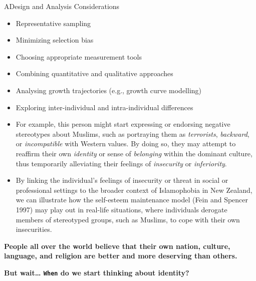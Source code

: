 \documentclass[
  ignorenonframetext,
  aspectratio=169,
]{beamer}
\providecommand{\tightlist}{%
  \setlength{\itemsep}{0pt}\setlength{\parskip}{0pt}}\usepackage{longtable,booktabs,array}
\begin{document}
\begin{frame}{ADesign and Analysis Considerations}
\label{adesign-and-analysis-considerations}
\begin{itemize}[<+->]
\tightlist
\item
  Representative sampling
\item
  Minimizing selection bias
\item
  Choosing appropriate measurement tools
\item
  Combining quantitative and qualitative approaches
\item
  Analysing growth trajectories (e.g., growth curve modelling)
\item
  Exploring inter-individual and intra-individual differences
\end{itemize}
\end{frame}

\begin{frame}
\begin{itemize}[<+->]
\tightlist
\item
  For example, this person might start expressing or endorsing negative
  stereotypes about Muslims, such as portraying them as
  \emph{terrorists}, \emph{backward}, or \emph{incompatible} with
  Western values. By doing so, they may attempt to reaffirm their own
  \emph{identity} or sense of \emph{belonging} within the dominant
  culture, thus temporarily alleviating their feelings of
  \emph{insecurity} or \emph{inferiority}.
\item
  By linking the individual's feelings of insecurity or threat in social
  or professional settings to the broader context of Islamophobia in New
  Zealand, we can illustrate how the self-esteem maintenance model (Fein
  and Spencer 1997) may play out in real-life situations, where
  individuals derogate members of stereotyped groups, such as Muslims,
  to cope with their own insecurities.
\end{itemize}
\end{frame}

\begin{frame}
\textbf{People all over the world believe that their own nation,
culture, language, and religion are better and more deserving than
others.}
\end{frame}

\begin{frame}[fragile]
\textbf{But wait\ldots{} \texttt{When} do we start thinking about
identity?}
\end{frame}
\end{document}

